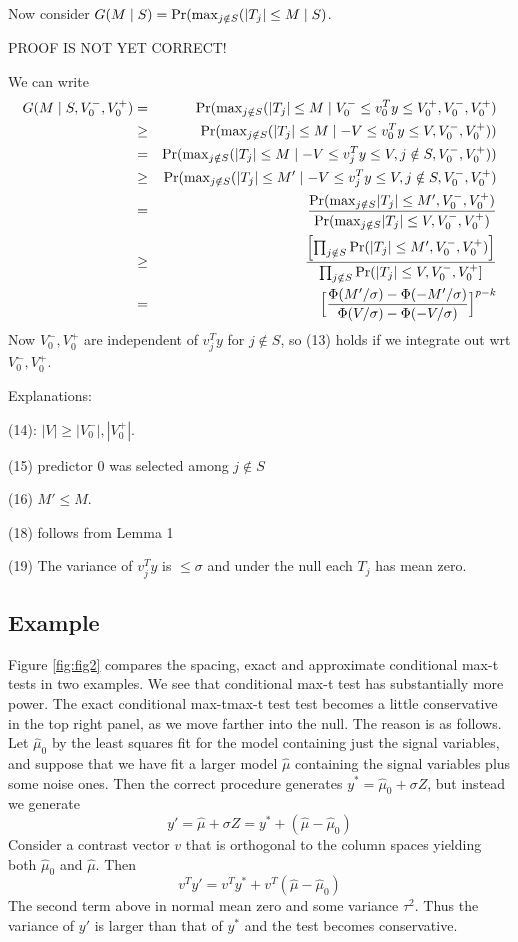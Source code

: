 \documentclass{article}
\begin{document}
Now consider $G(M \mid S)=\Pr({\rm max}_{j \notin S} (|T_j|\leq M \mid S)$.

PROOF IS NOT YET CORRECT!

We can write
\begin{eqnarray}
G(M \mid S, V_0^- ,V_0^+)&=&\Pr({\rm max}_{j \notin S} (|T_j|\leq M\mid V_0^- \leq v_0^Ty\leq V_0^+,V_0^- ,V_0^+)\\
&\geq &\Pr({\rm max}_{j \notin S} (|T_j|\leq M\mid -V \leq v_0^Ty\leq V, V_0^- ,V_0^+) )\\
&=&\Pr({\rm max}_{j \notin S} (|T_j|\leq M\mid  -V \leq v_j^Ty\leq V, j\notin S, V_0^- ,V_0^+)) \\
&\geq &\Pr({\rm max}_{j \notin S} (|T_j|\leq M'\mid -V \leq v_j^Ty\leq V, j\notin S, V_0^- ,V_0^+)\\
&=&  \frac{ {\Pr({\rm max}_{j \notin S} |T_j|\leq M'},V_0^- ,V_0^+) } { \Pr({\rm max}_{j \notin S} |T_j|\leq V, V_0^- ,V_0^+)}\\
&\geq & \frac{\Bigl[\prod_{j\notin S} \Pr(|T_j|\leq M', V_0^- ,V_0^+)\Bigr] } { \prod_{j\notin S} \Pr(|T_j|\leq V, V_0^- ,V_0^+]}\\
&=&\Bigl[\frac{\Phi(M'/\sigma)-\Phi(-M'/\sigma)}{\Phi(V/\sigma)-\Phi(-V/\sigma)}\Bigr]^{p-k} \\
\end{eqnarray}
Now $V_0^- ,V_0^+$ are independent of $v_j^Ty$ for $j\notin S$, so (13) holds if we integrate out wrt $V_0^- ,V_0^+$.

Explanations:

(14):  $|V| \geq |V_0^-|, |V_0^+|$.

(15)  predictor 0 was selected among $j \notin S$

(16)  $M' \leq M$.

(18)  follows from Lemma 1

(19) The variance of $v_j^Ty$ is $\leq \sigma$ and under the null each $T_j$ has mean zero.

\subsection{Example}


Figure \ref{fig:fig2} compares the spacing, exact and approximate conditional max-t tests in  two examples.
We see that conditional max-t test has substantially more power. The exact conditional max-tmax-t test test becomes
a little conservative in the top  right panel, as we move farther into the null. The reason is as follows.
Let $\hat \mu_0$ by the least squares fit for the model containing just the signal variables, and suppose that we have fit a larger model
$\hat\mu$ containing the signal variables plus some noise ones.  Then the correct procedure generates
$y^*=\hat\mu_0+\sigma Z$, but instead we generate
$$y'=\hat\mu+\sigma Z=y^*+(\hat\mu-\hat\mu_0)$$
Consider a contrast vector $v$ that is orthogonal to the column spaces yielding both $\hat\mu_0$ and $\hat\mu$.
Then 
$$v^T y'=v^T y^*+v^T(\hat\mu-\hat\mu_0)$$
The second term above in normal  mean zero and some variance $\tau^2$.
Thus the variance of $y'$ is larger than that of $y^*$ and the test becomes conservative.
\end{document}
